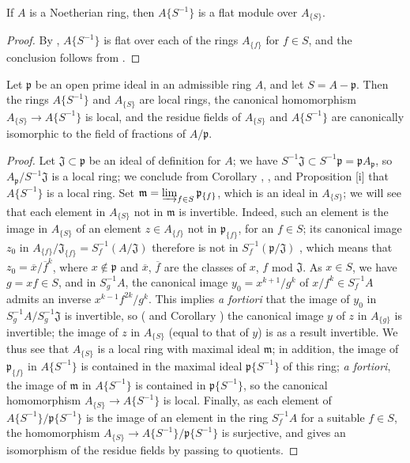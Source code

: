 \begin{proposition}[7.6.16]
\label{0.7.6.16}
If $A$ is a Noetherian ring, then $A\{S^{-1}\}$ is a flat module over $A_{\{S\}}$.
\end{proposition}

\begin{proof}
By , $A\{S^{-1}\}$ is flat over each of the rings $A_{\{f\}}$ for
$f\in S$, and the conclusion follows from .
\end{proof}

\begin{proposition}[7.6.17]
\label{0.7.6.17}
Let $\mathfrak{p}$ be an open prime ideal in an admissible ring $A$, and let $S=A-\mathfrak{p}$.
Then the rings $A\{S^{-1}\}$ and $A_{\{S\}}$ are local rings, the canonical homomorphism
$A_{\{S\}}\to A\{S^{-1}\}$ is local, and the residue fields of $A_{\{S\}}$ and $A\{S^{-1}\}$ are
canonically isomorphic to the field of fractions of $A/\mathfrak{p}$.
\end{proposition}

\begin{proof}
Let $\mathfrak{J}\subset\mathfrak{p}$ be an ideal of definition for $A$; we have
$S^{-1}\mathfrak{J}\subset S^{-1}\mathfrak{p}=\mathfrak{p}A_\mathfrak{p}$, so
$A_\mathfrak{p}/S^{-1}\mathfrak{J}$ is a local ring; we conclude from 
Corollary , , and
Proposition [i] that $A\{S^{-1}\}$ is a local ring. Set
$\mathfrak{m}=\varinjlim_{f\in S}\mathfrak{p}_{\{f\}}$, which is an ideal in $A_{\{S\}}$; we
will see that each element in $A_{\{S\}}$ not in $\mathfrak{m}$ is invertible. Indeed, such an
element is the image in $A_{\{S\}}$ of an element $z\in A_{\{f\}}$ not in $\mathfrak{p}_{\{f\}}$,
for an $f\in S$; its canonical image $z_0$ in
$A_{\{f\}}/\mathfrak{J}_{\{f\}}=S_f^{-1}(A/\mathfrak{J})$ therefore is not in
$S_f^{-1}(\mathfrak{p}/\mathfrak{J})$ , which means that
$z_0=\overline{x}/\overline{f}^k$, where $x\not\in\mathfrak{p}$ and $\overline{x}$, $\overline{f}$
are the classes of $x$, $f$ mod $\mathfrak{J}$. As $x\in S$, we have $g=xf\in S$, and in
$S_g^{-1}A$, the canonical image $y_0=x^{k+1}/g^k$ of $x/f^k\in S_f^{-1}A$ admits an inverse
$x^{k-1}f^{2k}/g^k$. This implies \emph{a fortiori} that the image of $y_0$ in
$S_g^{-1}A/S_g^{-1}\mathfrak{J}$ is invertible, so ( and
Corollary ) the canonical image $y$ of $z$ in $A_{\{g\}}$ is
invertible; the image of $z$ in $A_{\{S\}}$ (equal to that of $y$) is as a result invertible.
We thus see that $A_{\{S\}}$ is a local ring with maximal ideal $\mathfrak{m}$; in addition, the image
of $\mathfrak{p}_{\{f\}}$ in $A\{S^{-1}\}$ is contained in the maximal ideal $\mathfrak{p}\{S^{-1}\}$
of this ring; \emph{a fortiori}, the image of $\mathfrak{m}$ in $A\{S^{-1}\}$ is contained in
$\mathfrak{p}\{S^{-1}\}$, so the canonical homomorphism $A_{\{S\}}\to A\{S^{-1}\}$ is local. Finally,
as each element of $A\{S^{-1}\}/\mathfrak{p}\{S^{-1}\}$ is the image of an element in the ring
$S_f^{-1}A$ for a suitable $f\in S$, the homomorphism $A_{\{S\}}\to A\{S^{-1}\}/\mathfrak{p}\{S^{-1}\}$
is surjective, and gives an isomorphism of the residue fields by passing to quotients.
\end{proof}

